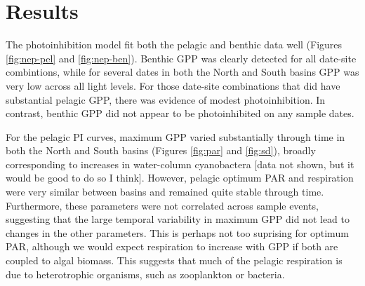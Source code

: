 \documentclass[12pt]{article}
\begin{document}

\section*{Results}

The photoinhibition model fit both the pelagic and benthic data well
(Figures \ref{fig:nep-pel} and \ref{fig:nep-ben}).
Benthic GPP was clearly detected for all date-site combintions,
while for several dates in both the North and South basins GPP was very low
across all light levels.
For those date-site combinations that did have substantial pelagic GPP,
there was evidence of modest photoinhibition.
In contrast, benthic GPP did not appear to be photoinhibited on any sample dates.

For the pelagic PI curves, 
maximum GPP varied substantially through time in both the North and South basins 
(Figures \ref{fig:par} and \ref{fig:sd}),
broadly corresponding to increases in water-column cyanobactera 
[data not shown, but it would be good to do so I think].
However, pelagic optimum PAR and respiration were very similar between basins
and remained quite stable through time.
Furthermore, these parameters were not correlated across sample events,
suggesting that the large temporal variability in maximum GPP
did not lead to changes in the other parameters.
This is perhaps not too suprising for optimum PAR,
although we would expect respiration to increase with GPP if both 
are coupled to algal biomass. 
This suggests that much of the pelagic respiration is due to heterotrophic organisms,
such as zooplankton or bacteria.
\end{document}
